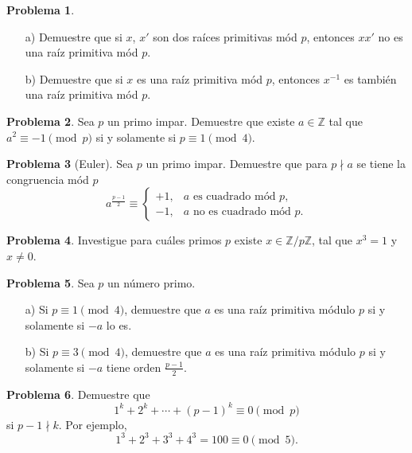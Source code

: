 \documentclass{article}
\newcommand{\ZZ}{\mathbb{Z}}
\theoremstyle{definition}
\newtheorem{problema}{Problema}[section]
\begin{document}
\begin{problema}
  ~

  \begin{enumerate}
  \item[a)] Demuestre que si $x$, $x'$ son dos raíces primitivas mód $p$,
    entonces $x x'$ no es una raíz primitiva mód $p$.

  \item[b)] Demuestre que si $x$ es una raíz primitiva mód $p$, entonces
    $x^{-1}$ es también una raíz primitiva mód $p$.
  \end{enumerate}
\end{problema}

\begin{problema}
  Sea $p$ un primo impar. Demuestre que existe $a \in \ZZ$ tal que
  $a^2 \equiv -1 \pmod{p}$ si y solamente si $p \equiv 1 \pmod{4}$.
\end{problema}

\begin{problema}[Euler]
  Sea $p$ un primo impar. Demuestre que para $p \nmid a$ se tiene
  la congruencia mód $p$
  \[ a^{\frac{p-1}{2}} \equiv
    \begin{cases}
      +1, & a \text{ es cuadrado mód }p, \\
      -1, & a \text{ no es cuadrado mód }p.
    \end{cases} \]
\end{problema}

\begin{problema}
  Investigue para cuáles primos $p$ existe $x \in \ZZ/p\ZZ$, tal que $x^3 = 1$ y
  $x \ne 0$.
\end{problema}

\begin{problema}
  Sea $p$ un número primo.

  \begin{enumerate}
  \item[a)] Si $p \equiv 1 \pmod{4}$, demuestre que $a$ es una raíz primitiva
    módulo $p$ si y solamente si $-a$ lo es.

  \item[b)] Si $p \equiv 3 \pmod{4}$, demuestre que $a$ es una raíz primitiva
    módulo $p$ si y solamente si $-a$ tiene orden $\frac{p-1}{2}$.
  \end{enumerate}
\end{problema}

\begin{problema}
  Demuestre que
  $$1^k + 2^k + \cdots + (p-1)^k \equiv 0 \pmod{p}$$
  si $p-1 \nmid k$. Por ejemplo,
  $$1^3 + 2^3 + 3^3 + 4^3 = 100 \equiv 0 \pmod{5}.$$
\end{problema}
\end{document}
